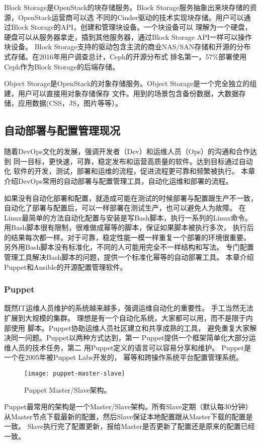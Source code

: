 Block Storage是OpenStack的块存储服务。Block Storage服务抽象出来块存储的资源，OpenStack运营商可以选
不同的Cinder驱动的技术实现块存储。用户可以通过Block Storage的API，创建和管理块设备。一个块设备可以
理解为一个硬盘，硬盘可以从服务器拿走，插到其他服务器，通过Block Storage API一样可以操作块设备。
Block Storage支持的驱动包含主流的商业NAS/SAN存储和开源的分布式存储。在2016年用户调查总计，Ceph的开源分布式
排名第一，57\%部署使用Ceph作为Block Storage的后端存储。

Object Storage是OpenStack的对象存储服务。Object Storage是一个完全独立的组建，用户可以直接用对象存储保存
文件。用到的场景包含备份数据，大数据存储，应用数据(CSS，JS，图片等等）。



\subsection{自动部署与配置管理现况}
\label{subsec:automated_deployment}
随着DevOps文化的发展，强调开发者（Dev）和运维人员（Ops）的沟通和合作达到
同一目标，更快速，可靠，稳定发布和运营高质量的软件。达到目标通过自动化
软件的开发，测试，部署和运维的流程，促进流程更可靠和频繁被执行。
本章介绍DevOps常用的自动部署与配置管理工具，自动化运维和部署的流程。

如果没有自动化部署和配置，就造成可能在测试的时候部署与配置跟生产不一致，
自动化了部署与配置后，可以一样部署在测试生产，也可以避免人为故障。
在Linux最简单的方法自动化配置与安装是写Bash脚本，执行一系列的Linux命令。
用Bash脚本很有限制，很难做成幂等的脚本，保证如果脚本被执行多次，
执行后的结果每次都一样。对于可靠，稳定性能一模一样重复一个部署的环境很重要。
另外用Bash脚本没有标准化，不同的人可能用完全不一样结构和写法。
专门配置管理工具解决Bash脚本的问题，提供一个标准化幂等的自动部署工具。
本章介绍Puppet和Ansible的开源配置管理软件。


\subsubsection{Puppet}
既然IT运维人员维护的系统越来越多，强调运维自动化的重要性。
手工当然无法扩展到大规模的集群。
理想是有一个自动化系统，大家都可以用，而不是限于内部使用
脚本。Puppet协助运维人员社区建立和共享成熟的工具，
避免重复大家解决同一问题。Puppet以两种方式达到，第一
Puppet提供一个框架简单化大部分运维人员的技术任务，第二
用Puppet定义的语言可以容易分享和维护。
Puppet是一个在2005年被Puppet Labs开发的，
幂等和跨操作系统平台配置管理系统。\cite{puppet_docs}

\begin{wrapfigure}{r}{0.40\textwidth}
  \centering
    \texttt{[image: puppet-master-slave]}
    \caption{Puppet Master/Slave架构。\cite{puppet_docs}}
  \label{fig:puppet-master-slave}
\end{wrapfigure}
Puppet最常用的架构是一个Master/Slave架构。所有Slave定期（默认每30分钟）
从Master节点下载最新的配置，然后Slave保证本地配置跟从Master下载的配置是一致。
Slave执行完了配置更新，报给Master是否更新了配置还是原来的配置已经一致。

